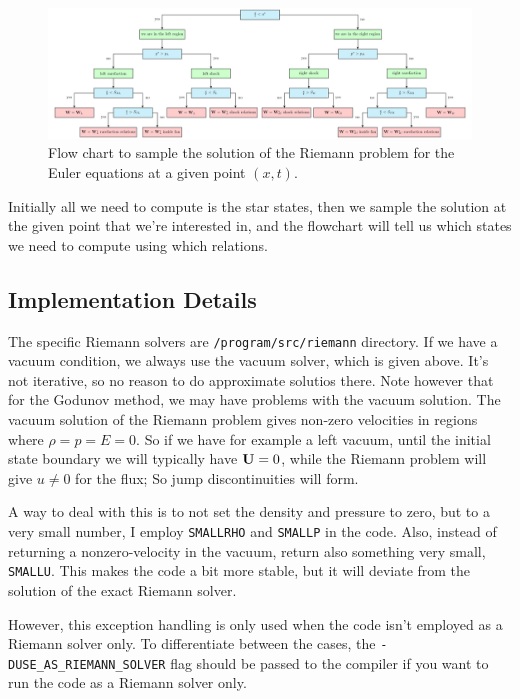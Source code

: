 \begin{figure}
	\includegraphics[]{./figures/tikz/sampling_the_solution.pdf}%
	\caption{Flow chart to sample the solution of the Riemann problem for the Euler equations at a given point $(x, t)$.
		\label{fig:sampling-solution}
	}
\end{figure}

Initially all we need to compute is the star states, then we sample the solution at the given point that we're interested in, and the flowchart will tell us which states we need to compute using which relations.










\subsection{Implementation Details}


The specific Riemann solvers are \texttt{/program/src/riemann} directory.
If we have a vacuum condition, we always use the vacuum solver, which is given above.
It's not iterative, so no reason to do approximate solutios there.
Note however that for the Godunov method, we may have problems with the vacuum solution.
The vacuum solution of the Riemann problem gives non-zero velocities in regions where $\rho = p = E = 0$.
So if we have for example a left vacuum, until the initial state boundary we will typically have $\mathbf{U} = 0$, while the Riemann problem will give $u \neq 0$ for the flux;
So jump discontinuities will form.

A way to deal with this is to not set the density and pressure to zero, but to a very small number, I employ \texttt{SMALLRHO} and \texttt{SMALLP} in the code.
Also, instead of returning a nonzero-velocity in the vacuum, return also something very small, \texttt{SMALLU}.
This makes the code a bit more stable, but it will deviate from the solution of the exact Riemann solver.


However, this exception handling is only used when the code isn't employed as a Riemann solver only.
To differentiate between the cases, the \verb|-DUSE_AS_RIEMANN_SOLVER| flag should be passed to the compiler if you want to run the code as a Riemann solver only.



